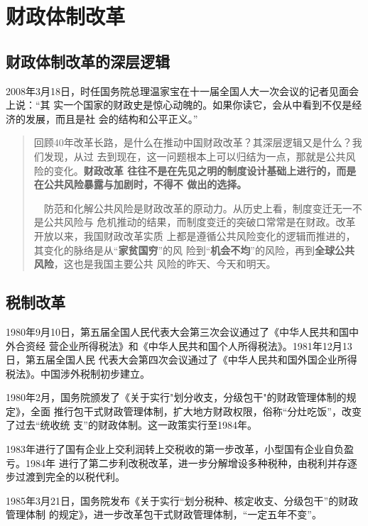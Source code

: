 \section{财政体制改革}

\subsection{财政体制改革的深层逻辑}

2008年3月18日，时任国务院总理温家宝在十一届全国人大一次会议的记者见面会上说：“其
实一个国家的财政史是惊心动魄的。如果你读它，会从中看到不仅是经济的发展，而且是社
会的结构和公平正义。”

\begin{quotation}
  回顾40年改革长路，是什么在推动中国财政改革？其深层逻辑又是什么？我们发现，从过
  去到现在，这一问题根本上可以归结为一点，那就是公共风险的变化。\textbf{财政改革
    往往不是在先见之明的制度设计基础上进行的，而是在公共风险暴露与加剧时，不得不
    做出的选择。}

  　防范和化解公共风险是财政改革的原动力。从历史上看，制度变迁无一不是公共风险与
  危机推动的结果，而制度变迁的突破口常常是在财政。改革开放以来，我国财政改革实质
  上都是遵循公共风险变化的逻辑而推进的，其变化的脉络是从“\textbf{家贫国穷}”的风
  险到“\textbf{机会不均}”的风险，再到\textbf{全球公共风险}，这也是我国主要公共
  风险的昨天、今天和明天。
\end{quotation}


\subsection{税制改革}

1980年9月10日，第五届全国人民代表大会第三次会议通过了《中华人民共和国中外合资经
营企业所得税法》和《中华人民共和国个人所得税法》。1981年12月13日，第五届全国人民
代表大会第四次会议通过了《中华人民共和国外国企业所得税法》。中国涉外税制初步建立。

1980年2月，国务院颁发了《关于实行"划分收支，分级包干"的财政管理体制的规定》，全面
推行包干式财政管理体制，扩大地方财政权限，俗称“分灶吃饭”，改变了过去“统收统
支”的财政体制。这一政策实行至1984年。

1983年进行了国有企业上交利润转上交税收的第一步改革，小型国有企业自负盈亏。1984年
进行了第二步利改税改革，进一步分解增设多种税种，由税利并存逐步过渡到完全的以税代利。

1985年3月21日，国务院发布《关于实行“划分税种、核定收支、分级包干”的财政管理体制
的规定》，进一步改革包干式财政管理体制，“一定五年不变”。

